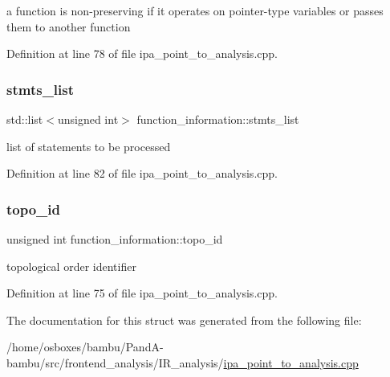 a function is non-\/preserving if it operates on pointer-\/type variables or passes them to another function 



Definition at line 78 of file ipa\+\_\+point\+\_\+to\+\_\+analysis.\+cpp.

\mbox{\label{structfunction__information_a4154e6d65260c36203f42f3181c3f743}} 
\subsubsection{\texorpdfstring{stmts\+\_\+list}{stmts\_list}}
{\footnotesize\ttfamily std\+::list$<$unsigned int$>$ function\+\_\+information\+::stmts\+\_\+list}



list of statements to be processed 



Definition at line 82 of file ipa\+\_\+point\+\_\+to\+\_\+analysis.\+cpp.

\mbox{\label{structfunction__information_a074b9818c571f70fa658e881ac929365}} 
\subsubsection{\texorpdfstring{topo\+\_\+id}{topo\_id}}
{\footnotesize\ttfamily unsigned int function\+\_\+information\+::topo\+\_\+id}



topological order identifier 



Definition at line 75 of file ipa\+\_\+point\+\_\+to\+\_\+analysis.\+cpp.



The documentation for this struct was generated from the following file\+:\begin{DoxyCompactItemize}
\item 
/home/osboxes/bambu/\+Pand\+A-\/bambu/src/frontend\+\_\+analysis/\+I\+R\+\_\+analysis/\hyperlink{ipa__point__to__analysis_8cpp}{ipa\+\_\+point\+\_\+to\+\_\+analysis.\+cpp}\end{DoxyCompactItemize}
